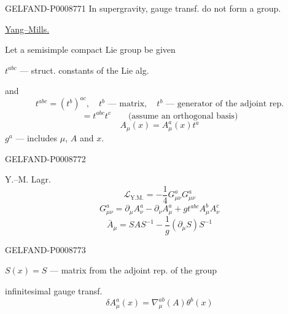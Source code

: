 \begin{GelfandAdjacentEvidence}{GELFAND-P000877}{1}
In supergravity, gauge transf. do not form a group.

\uline{Yang–Mills.}

Let a semisimple compact Lie group be given

$t^{abc}$ --- struct. constants of the Lie alg.

and
\begin{equation*}
t^{abc}=(t^b)^{ac},\quad t^b\text{ --- matrix},\quad t^b\text{ --- generator of the adjoint rep.}
\tag{52}
\end{equation*}
\begin{equation*}
[t^a,t^b]=t^{abc}t^c\qquad\text{(assume an orthogonal basis)}
\tag{53}
\end{equation*}
\begin{equation*}
A_\mu(x)=A_\mu^a(x)t^a
\tag{54}
\end{equation*}
$g^a$ --- includes $\mu$, $A$ and $x$.

\end{GelfandAdjacentEvidence}
\begin{GelfandAdjacentEvidence}{GELFAND-P000877}{2}


Y.–M. Lagr.
\begin{equation*}
\mathcal L_{\mathrm{Y.M.}}=-\frac14G_{\mu\nu}^aG_{\mu\nu}^a
\tag{55}
\end{equation*}
\begin{equation*}
G_{\mu\nu}^a=\partial_\mu A_\nu^a-\partial_\nu A_\mu^a+g t^{abc}A_\mu^b A_\nu^c
\tag{56}
\end{equation*}
\begin{equation*}
\bar A_\mu=SAS^{-1}-\frac1g(\partial_\mu S)S^{-1}
\tag{57}
\end{equation*}
\end{GelfandAdjacentEvidence}
\begin{GelfandAdjacentEvidence}{GELFAND-P000877}{3}


$S(x)=S$ --- matrix from the adjoint rep. of the group

infinitesimal gauge transf.
\begin{equation*}
\delta A_\mu^a(x)=\nabla_\mu^{ab}(A)\theta^b(x)
\tag{58}
\end{equation*}
\end{GelfandAdjacentEvidence}
